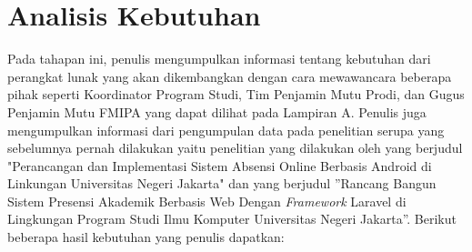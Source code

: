 \section{Analisis Kebutuhan}
Pada tahapan ini, penulis mengumpulkan informasi tentang kebutuhan dari perangkat lunak yang akan dikembangkan dengan cara mewawancara beberapa pihak seperti Koordinator Program Studi, Tim Penjamin Mutu Prodi, dan Gugus Penjamin Mutu FMIPA yang dapat dilihat pada Lampiran A. Penulis juga mengumpulkan informasi dari pengumpulan data pada penelitian serupa yang sebelumnya pernah dilakukan yaitu penelitian yang dilakukan oleh \cite{FitriAndiniMedIrzal2017} yang berjudul "Perancangan dan Implementasi Sistem Absensi Online Berbasis Android di Linkungan Universitas Negeri Jakarta"  dan \cite{Kultsum2021} yang berjudul ''Rancang Bangun Sistem Presensi Akademik Berbasis Web Dengan \textit{Framework} Laravel di Lingkungan Program Studi Ilmu Komputer Universitas Negeri Jakarta''. Berikut beberapa hasil kebutuhan yang penulis dapatkan:

